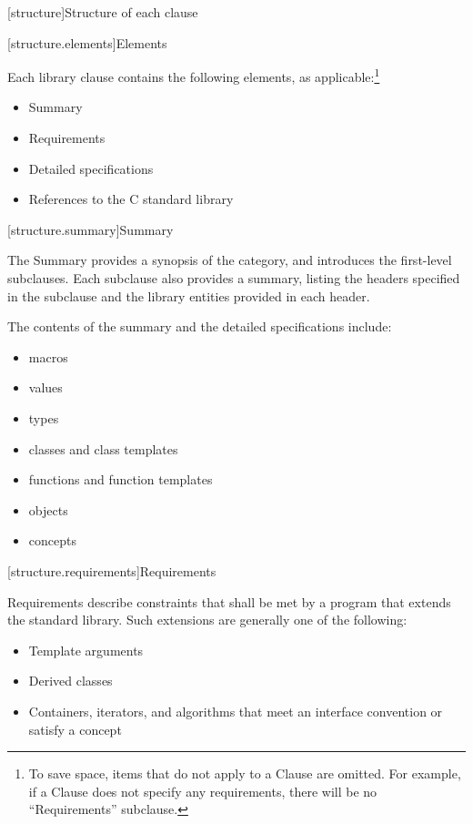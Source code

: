 [structure]{Structure of each clause}

[structure.elements]{Elements}

\pnum
Each library clause contains the following elements, as applicable:\footnote{To
save space, items that do not apply to a Clause are omitted.
For example, if a Clause does not specify any requirements,
there will be no ``Requirements'' subclause.}

\begin{itemize}
\item Summary
\item Requirements
\item Detailed specifications
\item References to the C standard library
\end{itemize}

[structure.summary]{Summary}

\pnum
The Summary provides a synopsis of the category, and introduces the first-level subclauses.
Each subclause also provides a summary, listing the headers specified in the
subclause and the library entities provided in each header.

\pnum
The contents of the summary and the detailed specifications include:

\begin{itemize}
\item macros
\item values
\item types
\item classes and class templates
\item functions and function templates
\item objects
\item concepts
\end{itemize}

[structure.requirements]{Requirements}

\pnum
{}%
Requirements describe constraints that shall be met by a \Cpp{} program that extends the standard library.
Such extensions are generally one of the following:

\begin{itemize}
\item Template arguments
\item Derived classes
\item Containers, iterators, and algorithms that meet an interface convention or
  satisfy a concept
\end{itemize}

